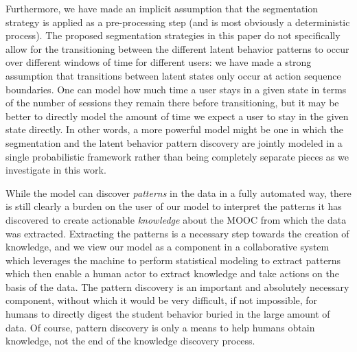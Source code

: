 Furthermore, we have made an implicit assumption that the segmentation
strategy is applied as a pre-processing step (and is most obviously a
deterministic process). The proposed segmentation strategies in this paper
do not specifically allow for the transitioning between the different
latent behavior patterns to occur over different windows of time for
different users: we have made a strong assumption that transitions between
latent states only occur at action sequence boundaries. One can model how
much time a user stays in a given state in terms of the number of sessions
they remain there before transitioning, but it may be better to directly
model the amount of time we expect a user to stay in the given state
directly. In other words, a more powerful model might be one in which the
segmentation and the latent behavior pattern discovery are jointly modeled
in a single probabilistic framework rather than being completely separate
pieces as we investigate in this work.

While the model can discover \emph{patterns} in the data in a fully
automated way, there is still clearly a burden on the user of our model to
interpret the patterns it has discovered to create actionable
\emph{knowledge} about the MOOC from which the data was extracted.
Extracting the patterns is a necessary step towards the creation of
knowledge, and we view our model as a component in a collaborative system
which leverages the machine to perform statistical modeling to extract
patterns which then enable a human actor to extract knowledge and take
actions on the basis of the data. The pattern discovery is an important
and absolutely necessary component, without which it would be very difficult, if not impossible, 
for humans to directly digest the student behavior buried in the large amount of 
data.  Of course, pattern discovery is only a means to help humans obtain knowledge, not the end of the knowledge discovery process.
